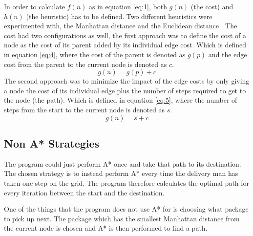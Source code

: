 \documentclass[12pt, a4paper]{article}
\begin{document}
In order to calculate $f(n)$ as in equation \ref{eq:1}, both $g(n)$ (the cost) and $h(n)$ (the heuristic) has to be defined. Two different heuristics were experimented with, the Manhattan distance \cite{manD} and the Euclidean distance \cite{eucD}. The cost had two configurations as well, the first approach was to define the cost of a node as the cost of its parent added by its individual edge cost. Which is defined in equation \ref{eq:4}, where the cost of the parent is denoted as $g(p)$ and the edge cost from the parent to the current node is denoted as $c$.
\begin{equation} \label{eq:4}
g(n) = g(p) + c
\end{equation}
The second approach was to minimize the impact of the edge costs by only giving a node the cost of its individual edge plus the number of steps required to get to the node (the path). Which is defined in equation \ref{eq:5}, where the number of steps from the start to the current node is denoted as $s$.
\begin{equation} \label{eq:5}
g(n) = s + c
\end{equation}



\subsection{Non A* Strategies}

The program could just perform A* once and take that path to its destination. The chosen strategy is to instead perform A* every time the delivery man has taken one step on the grid. The program therefore calculates the optimal path for every iteration between the start and the destination.

One of the things that the program does not use A* for is choosing what package to pick up next. The package which has the smallest Manhattan distance from the current node is chosen and A* is then performed to find a path.
\end{document}
